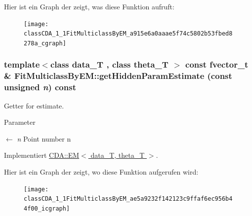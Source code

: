 Hier ist ein Graph der zeigt, was diese Funktion aufruft:\nopagebreak
\begin{figure}[H]
\begin{center}
\leavevmode
\texttt{[image: classCDA\_1\_1FitMulticlassByEM\_a915e6a0aaae5f74c5802b53fbed8278a\_cgraph]}
\end{center}
\end{figure}


\hypertarget{classCDA_1_1FitMulticlassByEM_ae5a9232f142123c9ffaf6ec956b44f00}{
\subsubsection[{getHiddenParamEstimate}]{\setlength{\rightskip}{0pt plus 5cm}template$<$class data\_\-T , class theta\_\-T $>$ const fvector\_\-t \& FitMulticlassByEM::getHiddenParamEstimate (const unsigned {\em n}) const}}
\label{classCDA_1_1FitMulticlassByEM_ae5a9232f142123c9ffaf6ec956b44f00}


Getter for estimate. 


\begin{DoxyParams}{Parameter}
\item[\mbox{$\leftarrow$} {\em n}]Point number n \end{DoxyParams}


Implementiert \hyperlink{classCDA_1_1EM_aad68b7444dac8fa5e1b0d7413c8ed87c}{CDA::EM$<$ data\_\-T, theta\_\-T $>$}.



Hier ist ein Graph der zeigt, wo diese Funktion aufgerufen wird:\nopagebreak
\begin{figure}[H]
\begin{center}
\leavevmode
\texttt{[image: classCDA\_1\_1FitMulticlassByEM\_ae5a9232f142123c9ffaf6ec956b44f00\_icgraph]}
\end{center}
\end{figure}


